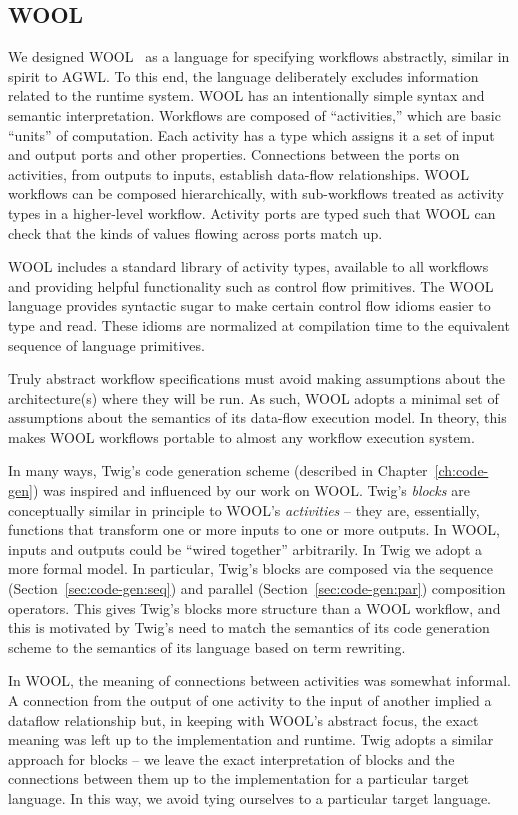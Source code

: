 \subsection{WOOL}
\label{sec:bg:wool}

We designed WOOL~\cite{wool} as a language for specifying
workflows abstractly, similar in spirit to AGWL. To this end, the
language deliberately excludes information related to the runtime
system. WOOL has an intentionally simple syntax and semantic
interpretation. Workflows are composed of ``activities,'' which
are basic ``units'' of computation. Each activity has a type which
assigns it a set of input and output ports and other properties.
Connections between the ports on activities, from outputs to
inputs, establish data-flow relationships. WOOL workflows can be
composed hierarchically, with sub-workflows treated as activity
types in a higher-level workflow. Activity ports are typed such
that WOOL can check that the kinds of values flowing across ports
match up.

WOOL includes a standard library of activity types, available to
all workflows and providing helpful functionality such as control
flow primitives. The WOOL language provides syntactic sugar to
make certain control flow idioms easier to type and read. These
idioms are normalized at compilation time to the equivalent
sequence of language primitives.

Truly abstract workflow specifications must avoid making
assumptions about the architecture(s) where they will be run. As
such, WOOL adopts a minimal set of assumptions about the semantics
of its data-flow execution model. In theory, this makes WOOL
workflows portable to almost any workflow execution system.

In many ways, Twig's code generation scheme (described in
Chapter~\ref{ch:code-gen}) was inspired and influenced by our work
on WOOL. Twig's \emph{blocks} are conceptually similar in
principle to WOOL's \emph{activities} -- they are, essentially,
functions that transform one or more inputs to one or more
outputs. In WOOL, inputs and outputs could be ``wired together''
arbitrarily. In Twig we adopt a more formal model. In particular,
Twig's blocks are composed via the sequence
(Section~\ref{sec:code-gen:seq}) and parallel
(Section~\ref{sec:code-gen:par}) composition operators. This gives
Twig's blocks more structure than a WOOL workflow, and this is
motivated by Twig's need to match the semantics of its code
generation scheme to the semantics of its language based on term
rewriting.

In WOOL, the meaning of connections between activities was
somewhat informal. A connection from the output of one activity to
the input of another implied a dataflow relationship but, in
keeping with WOOL's abstract focus, the exact meaning was left up
to the implementation and runtime. Twig adopts a similar approach
for blocks -- we leave the exact interpretation of blocks and the
connections between them up to the implementation for a particular
target language. In this way, we avoid tying ourselves to a
particular target language.
